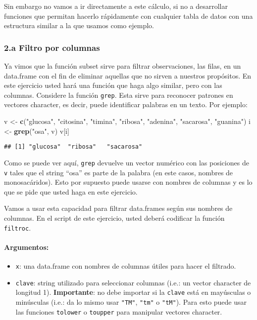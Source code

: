 \documentclass[]{article}
\newenvironment{Shaded}{}{}
\newcommand{\KeywordTok}[1]{\textcolor[rgb]{0.00,0.44,0.13}{\textbf{{#1}}}}
\newcommand{\StringTok}[1]{\textcolor[rgb]{0.25,0.44,0.63}{{#1}}}
\newcommand{\NormalTok}[1]{{#1}}
\begin{document}
Sin embargo no vamos a ir directamente a este cálculo, si no a
desarrollar funciones que permitan hacerlo rápidamente con cualquier
tabla de datos con una estructura similar a la que usamos como ejemplo.

\subsubsection{2.a Filtro por columnas}

Ya vimos que la función subset sirve para filtrar observaciones, las
filas, en un data.frame con el fin de eliminar aquellas que no sirven a
nuestros propósitos. En este ejercicio usted hará una función que haga
algo similar, pero con las columnas. Considere la función \texttt{grep}.
Esta sirve para reconocer patrones en vectores character, es decir,
puede identificar palabras en un texto. Por ejemplo:

\begin{Shaded}
\begin{Highlighting}[]
\NormalTok{v <-}\StringTok{ }\KeywordTok{c}\NormalTok{(}\StringTok{"glucosa"}\NormalTok{, }\StringTok{"citosina"}\NormalTok{, }\StringTok{"timina"}\NormalTok{, }\StringTok{"ribosa"}\NormalTok{, }\StringTok{"adenina"}\NormalTok{, }\StringTok{"sacarosa"}\NormalTok{, }\StringTok{"guanina"}\NormalTok{)}
\NormalTok{i <-}\StringTok{ }\KeywordTok{grep}\NormalTok{(}\StringTok{"osa"}\NormalTok{, v)}
\NormalTok{v[i]}
\end{Highlighting}
\end{Shaded}

\begin{verbatim}
## [1] "glucosa"  "ribosa"   "sacarosa"
\end{verbatim}

Como se puede ver aquí, \texttt{grep} devuelve un vector numérico con
las posiciones de \texttt{v} tales que el string ``osa'' es parte de la
palabra (en este casos, nombres de monosacáridos). Esto por supuesto
puede usarse con nombres de columnas y es lo que se pide que usted haga
en este ejercicio.

Vamos a usar esta capacidad para filtrar data.frames según sus nombres
de columnas. En el script de este ejercicio, usted deberá codificar la
función \texttt{filtroc}.

\paragraph{Argumentos:}

\begin{itemize}
\item
  \texttt{x}: una data.frame con nombres de columnas útiles para hacer
  el filtrado.
\item
  \texttt{clave}: string utilizado para seleccionar columnas (i.e.: un
  vector character de longitud 1). \textbf{Importante}: no debe importar
  si la \texttt{clave} está en mayúsculas o minúsculas (i.e.: da lo
  mismo usar \texttt{"TM"}, \texttt{"tm"} o \texttt{"tM"}). Para esto
  puede usar las funciones \texttt{tolower} o \texttt{toupper} para
  manipular vectores character.
\end{itemize}
\end{document}
